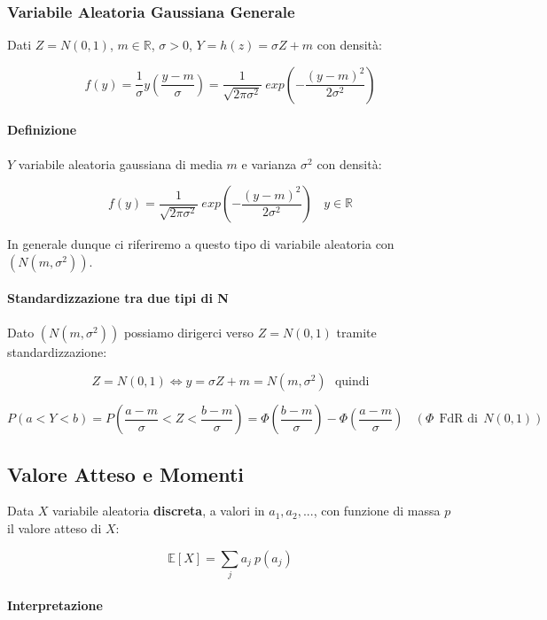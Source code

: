 \documentclass{article}
\begin{document}
\subsubsection{Variabile Aleatoria Gaussiana Generale}

Dati $Z = N(0,1)$, $m \in \mathbb{R}$, $\sigma > 0$, $Y=h(z)=\sigma Z + m$ con densità:

\[ f(y) = \frac{1}{\sigma}y(\frac{y-m}{\sigma}) = \frac{1}{\sqrt{2 \pi \sigma^{2}}} \: exp \left( -\frac{(y-m)^{2}}{2 \sigma^{2}} \right) \]

\paragraph{Definizione} $Y$ variabile aleatoria gaussiana di media $m$ e varianza $\sigma^{2}$ con densità:

\[ f(y) = \frac{1}{\sqrt{2 \pi \sigma^{2}}} \: exp \left( -\frac{(y-m)^{2}}{2 \sigma^{2}} \right) \:\:\:\: y \in \mathbb{R} \]

In generale dunque ci riferiremo a questo tipo di variabile aleatoria con $(N(m,\sigma^{2}))$.

\newpage

\paragraph{Standardizzazione tra due tipi di N}

Dato $(N(m,\sigma^{2}))$ possiamo dirigerci verso $Z = N(0,1)$ tramite standardizzazione:

\[ Z = N(0,1) \Leftrightarrow y = \sigma Z + m  = N(m, \sigma^{2}) \:\:\: \text{quindi}\]

\[ P(a < Y < b) = P(\frac{a-m}{\sigma} < Z < \frac{b-m}{\sigma}) = \Phi \left( \frac{b-m}{\sigma} \right)- \Phi\left(\frac{a-m}{\sigma} \right) \:\:\:\: (\Phi \:\: \text{FdR di} \: \: N(0,1)) \]

\subsection{Valore Atteso e Momenti}

Data $X$ variabile aleatoria \textbf{discreta}, a valori in $a_{1}, a_{2}, ...$, con funzione di massa $p$ il valore atteso di $X$:

\[ \mathbb{E}[X] = \sum_{j} a_{j}\: p(a_{j}) \]

\paragraph{Interpretazione}
\end{document}
